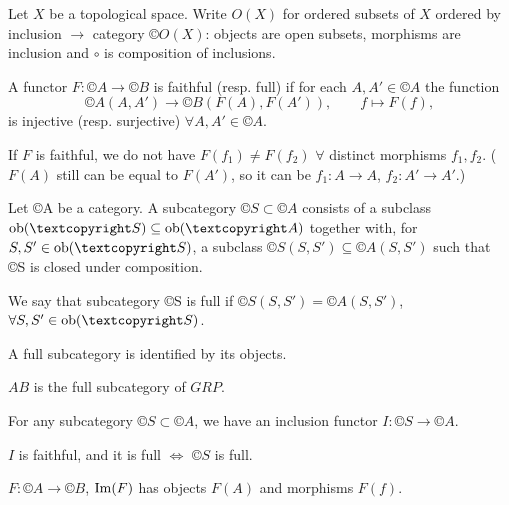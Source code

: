\documentclass[12pt]{article}					%
\begin{document}
\begin{priklad}
	Let $X$ be a topological space. Write $O(X)$ for ordered subsets of $X$ ordered by inclusion $\rightarrow$ category $©O(X)$: objects are open subsets, morphisms are inclusion and $∘$ is composition of inclusions.
\end{priklad}

\begin{definice}
	A functor $F: ©A \rightarrow ©B$ is faithful (resp. full) if for each $A, A' \in ©A$ the function
	$$ ©A(A, A') \rightarrow ©B(F(A), F(A')), \qquad f \mapsto F(f), $$
	is injective (resp. surjective) $\forall A, A' \in ©A$.
\end{definice}

\begin{upozorneni}
	If $F$ is faithful, we do not have $F(f_1) ≠ F(f_2)$ $\forall$ distinct morphisms $f_1, f_2$. ($F(A)$ still can be equal to $F(A')$, so it can be $f_1: A \rightarrow A$, $f_2: A' \rightarrow A'$.)
\end{upozorneni}

\begin{definice}[Subcategory]
	Let ©A be a category. A subcategory $©S \subset ©A$ consists of a subclass $\ob(©S) \subseteq \ob(©A)$ together with, for $S, S' \in \ob(©S)$, a subclass $©S(S, S') \subseteq ©A(S, S')$ such that ©S is closed under composition.
\end{definice}

\begin{definice}
	We say that subcategory ©S is full if $©S(S, S') = ©A(S, S')$, $\forall S, S' \in \ob(©S)$.

	\begin{poznamkain}
		A full subcategory is identified by its objects.
	\end{poznamkain}
\end{definice}

\begin{priklady}
	$AB$ is the full subcategory of $GRP$.
\end{priklady}

\begin{priklad}
	For any subcategory $©S \subset ©A$, we have an inclusion functor $I: ©S \rightarrow ©A$.

	$I$ is faithful, and it is full $\Leftrightarrow$ $©S$ is full.
\end{priklad}

\begin{definice}
	$F: ©A \rightarrow ©B$, $\operatorname{Im}(F)$ has objects $F(A)$ and morphisms $F(f)$.
\end{definice}
\end{document}
